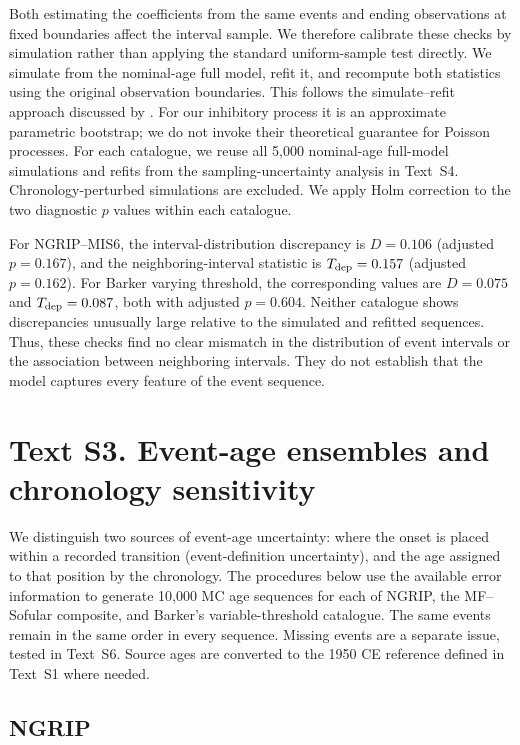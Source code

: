 \documentclass[11pt]{article}
\begin{document}
Both estimating the coefficients from the same events and ending observations at fixed boundaries affect the interval sample. We therefore calibrate these checks by simulation rather than applying the standard uniform-sample test directly. We simulate from the nominal-age full model, refit it, and recompute both statistics using the original observation boundaries. This follows the simulate--refit approach discussed by \citet{kling2026goodness}. For our inhibitory process it is an approximate parametric bootstrap; we do not invoke their theoretical guarantee for Poisson processes. For each catalogue, we reuse all 5,000 nominal-age full-model simulations and refits from the sampling-uncertainty analysis in Text~S4. Chronology-perturbed simulations are excluded. We apply Holm correction to the two diagnostic $p$ values within each catalogue.

For NGRIP--MIS6, the interval-distribution discrepancy is $D=0.106$ (adjusted $p=0.167$), and the neighboring-interval statistic is $T_{\rm dep}=0.157$ (adjusted $p=0.162$). For Barker varying threshold, the corresponding values are $D=0.075$ and $T_{\rm dep}=0.087$, both with adjusted $p=0.604$. Neither catalogue shows discrepancies unusually large relative to the simulated and refitted sequences. Thus, these checks find no clear mismatch in the distribution of event intervals or the association between neighboring intervals. They do not establish that the model captures every feature of the event sequence.

\section*{Text S3. Event-age ensembles and chronology sensitivity}

We distinguish two sources of event-age uncertainty: where the onset is placed within a recorded transition (event-definition uncertainty), and the age assigned to that position by the chronology. The procedures below use the available error information to generate 10,000 MC age sequences for each of NGRIP, the MF--Sofular composite, and Barker's variable-threshold catalogue. The same events remain in the same order in every sequence. Missing events are a separate issue, tested in Text~S6. Source ages are converted to the 1950 CE reference defined in Text~S1 where needed.

\subsection*{NGRIP}
\end{document}

